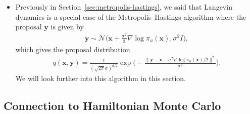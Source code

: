 \documentclass[10pt]{article}
\newcommand{\ve}[1]{\mathbf{#1}}
\newcommand{\mcal}[1]{\mathcal{#1}}
\begin{document}
\begin{itemize}
  \item Previously in Section~\ref{sec:metropolis-hastings}, we said that Langevin dynamics is a special case of the Metropolis--Hastings algorithm where the proposal $\ve{y}$ is given by
  \begin{align*}
    \ve{y} \sim \mcal{N}\bigg( \ve{x} + \frac{\sigma^2}{2} \nabla \log \pi_u(\ve{x}), \sigma^2 I \bigg),
  \end{align*}
  which gives the proposal distribution
  \begin{align*}
    q(\ve{x},\ve{y}) = \frac{1}{ (\sqrt{2\pi} \sigma)^{d/2} } \exp\bigg( - \frac{ \| \ve{y} - \ve{x} - \sigma^2 \nabla \log \pi_u(\ve{x})/2 \|^2}{\sigma^2} \bigg).
  \end{align*}
  We will look further into this algorithm in this section.
\end{itemize}

\subsection{Connection to Hamiltonian Monte Carlo}
\end{document}
